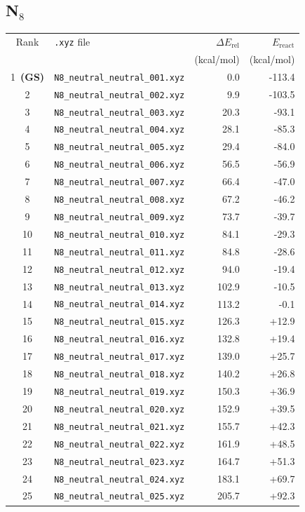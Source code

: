 \documentclass[11pt,a4paper]{article}
\begin{document}
\subsection*{N$_{8}$}
\begin{longtable}{clrr}
\toprule
Rank & \texttt{.xyz} file & $\Delta E_\text{rel}$ & $E_\text{react}$ \\
 & & (kcal/mol) & (kcal/mol) \\
\midrule\endhead
\rowcolor{gs}1~\textbf{(GS)} & \texttt{N8\_neutral\_neutral\_001.xyz} & 0.0 & -113.4 \\
2 & \texttt{N8\_neutral\_neutral\_002.xyz} & 9.9 & -103.5 \\
3 & \texttt{N8\_neutral\_neutral\_003.xyz} & 20.3 & -93.1 \\
4 & \texttt{N8\_neutral\_neutral\_004.xyz} & 28.1 & -85.3 \\
5 & \texttt{N8\_neutral\_neutral\_005.xyz} & 29.4 & -84.0 \\
6 & \texttt{N8\_neutral\_neutral\_006.xyz} & 56.5 & -56.9 \\
7 & \texttt{N8\_neutral\_neutral\_007.xyz} & 66.4 & -47.0 \\
8 & \texttt{N8\_neutral\_neutral\_008.xyz} & 67.2 & -46.2 \\
9 & \texttt{N8\_neutral\_neutral\_009.xyz} & 73.7 & -39.7 \\
10 & \texttt{N8\_neutral\_neutral\_010.xyz} & 84.1 & -29.3 \\
11 & \texttt{N8\_neutral\_neutral\_011.xyz} & 84.8 & -28.6 \\
12 & \texttt{N8\_neutral\_neutral\_012.xyz} & 94.0 & -19.4 \\
13 & \texttt{N8\_neutral\_neutral\_013.xyz} & 102.9 & -10.5 \\
14 & \texttt{N8\_neutral\_neutral\_014.xyz} & 113.2 & -0.1 \\
15 & \texttt{N8\_neutral\_neutral\_015.xyz} & 126.3 & +12.9 \\
16 & \texttt{N8\_neutral\_neutral\_016.xyz} & 132.8 & +19.4 \\
17 & \texttt{N8\_neutral\_neutral\_017.xyz} & 139.0 & +25.7 \\
18 & \texttt{N8\_neutral\_neutral\_018.xyz} & 140.2 & +26.8 \\
19 & \texttt{N8\_neutral\_neutral\_019.xyz} & 150.3 & +36.9 \\
20 & \texttt{N8\_neutral\_neutral\_020.xyz} & 152.9 & +39.5 \\
21 & \texttt{N8\_neutral\_neutral\_021.xyz} & 155.7 & +42.3 \\
22 & \texttt{N8\_neutral\_neutral\_022.xyz} & 161.9 & +48.5 \\
23 & \texttt{N8\_neutral\_neutral\_023.xyz} & 164.7 & +51.3 \\
24 & \texttt{N8\_neutral\_neutral\_024.xyz} & 183.1 & +69.7 \\
25 & \texttt{N8\_neutral\_neutral\_025.xyz} & 205.7 & +92.3 \\
\bottomrule
\end{longtable}
\end{document}
